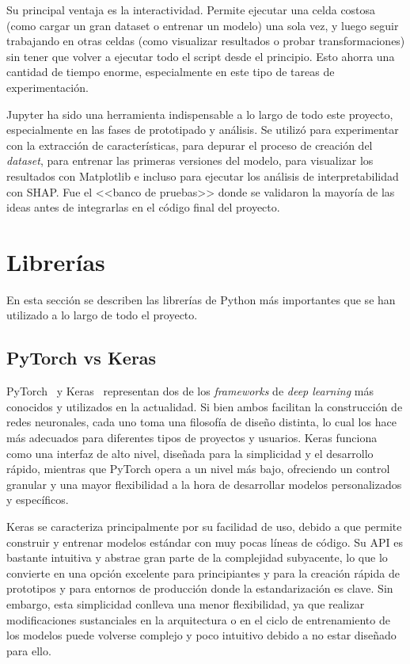 Su principal ventaja es la interactividad. Permite ejecutar una celda costosa (como cargar un gran dataset o entrenar un modelo) una sola vez, y luego seguir trabajando en otras celdas (como visualizar resultados o probar transformaciones) sin tener que volver a ejecutar todo el script desde el principio. Esto ahorra una cantidad de tiempo enorme, especialmente en este tipo de tareas de experimentación.

Jupyter ha sido una herramienta indispensable a lo largo de todo este proyecto, especialmente en las fases de prototipado y análisis. Se utilizó para experimentar con la extracción de características, para depurar el proceso de creación del \textit{dataset}, para entrenar las primeras versiones del modelo, para visualizar los resultados con Matplotlib e incluso para ejecutar los análisis de interpretabilidad con SHAP. Fue el <<banco de pruebas>> donde se validaron la mayoría de las ideas antes de integrarlas en el código final del proyecto.

\section{Librerías}

En esta sección se describen las librerías de Python más importantes que se han utilizado a lo largo de todo el proyecto.

\subsection{PyTorch vs Keras}


PyTorch~\cite{pytorchDoc} y Keras~\cite{kerasDoc} representan dos de los \textit{frameworks} de \textit{deep learning} más conocidos y utilizados en la actualidad. Si bien ambos facilitan la construcción de redes neuronales, cada uno toma una filosofía de diseño distinta, lo cual los hace más adecuados para diferentes tipos de proyectos y usuarios. Keras funciona como una interfaz de alto nivel, diseñada para la simplicidad y el desarrollo rápido, mientras que PyTorch opera a un nivel más bajo, ofreciendo un control granular y una mayor flexibilidad a la hora de desarrollar modelos personalizados y específicos.

Keras se caracteriza principalmente por su facilidad de uso, debido a que permite construir y entrenar modelos estándar con muy pocas líneas de código. Su API es bastante intuitiva y abstrae gran parte de la complejidad subyacente, lo que lo convierte en una opción excelente para principiantes y para la creación rápida de prototipos y para entornos de producción donde la estandarización es clave. Sin embargo, esta simplicidad conlleva una menor flexibilidad, ya que realizar modificaciones sustanciales en la arquitectura o en el ciclo de entrenamiento de los modelos puede volverse complejo y poco intuitivo debido a no estar diseñado para ello.

